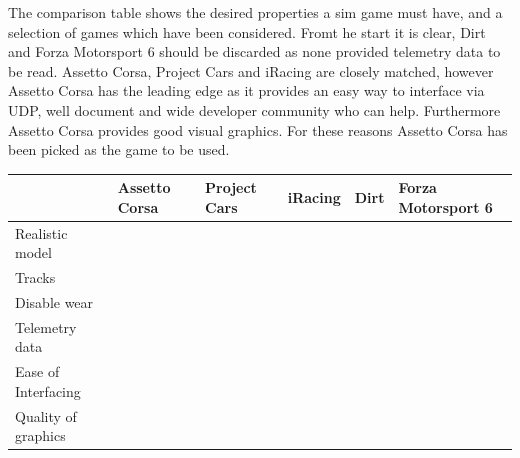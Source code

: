 The comparison table shows the desired properties a sim game must have, and a selection of games which have been considered. Fromt he start it is clear, Dirt and Forza Motorsport 6 should be discarded as none provided telemetry data to be read. Assetto Corsa, Project Cars and iRacing are closely matched, however Assetto Corsa has the leading edge as it provides an easy way to interface via UDP, well document and wide developer community who can help. Furthermore Assetto Corsa provides good visual graphics. For these reasons Assetto Corsa has been picked as the game to be used.

\begin{center}
	\begin{tabular}{ | l | l | l | l | l | l |}
		\hline
			& Assetto Corsa & Project Cars & iRacing & Dirt & Forza Motorsport 6 \\ \hline
		Realistic model	& \checkmark &\checkmark & \checkmark & \checkmark & \checkmark \\ \hline
		Tracks	& \checkmark &\checkmark & \checkmark &  & \checkmark \\ \hline
		Disable wear & \checkmark & \checkmark & \checkmark & \checkmark & \checkmark \\ \hline
		Telemetry data	& \checkmark & \checkmark & \checkmark &  &  \\ \hline
		Ease of Interfacing	& \checkmark &  & \checkmark &  &  \\ \hline
		Quality of graphics & \checkmark & \checkmark &  & \checkmark & \checkmark \\ \hline
	\end{tabular}
\end{center}

